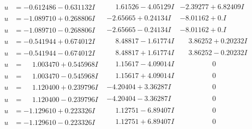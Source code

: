 \documentclass[1p]{elsarticle_modified}
\theoremstyle{definition}
\begin{document}
$$\begin{array}{c|c|c}
\begin{aligned}
u &= -0.612486 - 0.631132 I\end{aligned}
 & \phantom{-}1.61526 - 4.05129 I & -2.39277 + 6.82409 I \\ \hline\begin{aligned}
u &= -1.089710 + 0.268806 I\end{aligned}
 & -2.65665 + 0.24134 I & -8.01162 + 0. I\phantom{ +0.000000I} \\ \hline\begin{aligned}
u &= -1.089710 - 0.268806 I\end{aligned}
 & -2.65665 - 0.24134 I & -8.01162 + 0. I\phantom{ +0.000000I} \\ \hline\begin{aligned}
u &= -0.541944 + 0.674012 I\end{aligned}
 & \phantom{-}8.48817 - 1.61774 I & \phantom{-}3.86252 + 0.20232 I \\ \hline\begin{aligned}
u &= -0.541944 - 0.674012 I\end{aligned}
 & \phantom{-}8.48817 + 1.61774 I & \phantom{-}3.86252 - 0.20232 I \\ \hline\begin{aligned}
u &= \phantom{-}1.003470 + 0.545968 I\end{aligned}
 & \phantom{-}1.15617 - 4.09014 I & \phantom{-0.000000 } 0 \\ \hline\begin{aligned}
u &= \phantom{-}1.003470 - 0.545968 I\end{aligned}
 & \phantom{-}1.15617 + 4.09014 I & \phantom{-0.000000 } 0 \\ \hline\begin{aligned}
u &= \phantom{-}1.120400 + 0.239796 I\end{aligned}
 & -4.20404 + 3.36287 I & \phantom{-0.000000 } 0 \\ \hline\begin{aligned}
u &= \phantom{-}1.120400 - 0.239796 I\end{aligned}
 & -4.20404 - 3.36287 I & \phantom{-0.000000 } 0 \\ \hline\begin{aligned}
u &= -1.129610 + 0.223326 I\end{aligned}
 & \phantom{-}1.12751 - 6.89407 I & \phantom{-0.000000 } 0 \\ \hline\begin{aligned}
u &= -1.129610 - 0.223326 I\end{aligned}
 & \phantom{-}1.12751 + 6.89407 I & \phantom{-0.000000 } 0 \\ \hline\begin{aligned}

\end{aligned}
\end{array}$$
\end{document}

